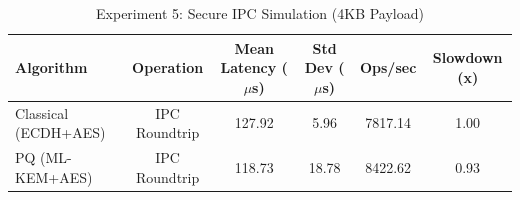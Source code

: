 \begin{table}
\caption{Experiment 5: Secure IPC Simulation (4KB Payload)}
\label{tab:exp5}
\begin{tabular}{lccccc}
\toprule
Algorithm & Operation & Mean Latency ($\mu$s) & Std Dev ($\mu$s) & Ops/sec & Slowdown (x) \\
\midrule
Classical (ECDH+AES) & IPC Roundtrip & 127.92 & 5.96 & 7817.14 & 1.00 \\
PQ (ML-KEM+AES) & IPC Roundtrip & 118.73 & 18.78 & 8422.62 & 0.93 \\
\bottomrule
\end{tabular}
\end{table}
